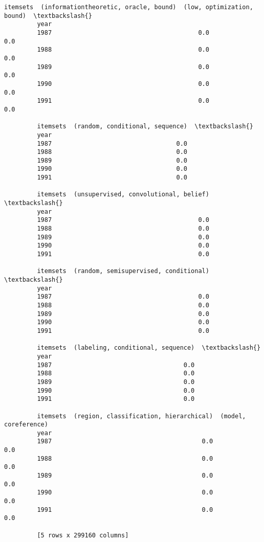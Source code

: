 \documentclass[11pt]{article}
\begin{document}
\begin{Verbatim}[commandchars=\\\{\}]
         itemsets  (informationtheoretic, oracle, bound)  (low, optimization, bound)  \textbackslash{}
         year                                                                          
         1987                                        0.0                         0.0   
         1988                                        0.0                         0.0   
         1989                                        0.0                         0.0   
         1990                                        0.0                         0.0   
         1991                                        0.0                         0.0   
         
         itemsets  (random, conditional, sequence)  \textbackslash{}
         year                                        
         1987                                  0.0   
         1988                                  0.0   
         1989                                  0.0   
         1990                                  0.0   
         1991                                  0.0   
         
         itemsets  (unsupervised, convolutional, belief)  \textbackslash{}
         year                                              
         1987                                        0.0   
         1988                                        0.0   
         1989                                        0.0   
         1990                                        0.0   
         1991                                        0.0   
         
         itemsets  (random, semisupervised, conditional)  \textbackslash{}
         year                                              
         1987                                        0.0   
         1988                                        0.0   
         1989                                        0.0   
         1990                                        0.0   
         1991                                        0.0   
         
         itemsets  (labeling, conditional, sequence)  \textbackslash{}
         year                                          
         1987                                    0.0   
         1988                                    0.0   
         1989                                    0.0   
         1990                                    0.0   
         1991                                    0.0   
         
         itemsets  (region, classification, hierarchical)  (model, coreference)  
         year                                                                    
         1987                                         0.0                   0.0  
         1988                                         0.0                   0.0  
         1989                                         0.0                   0.0  
         1990                                         0.0                   0.0  
         1991                                         0.0                   0.0  
         
         [5 rows x 299160 columns]
\end{Verbatim}
            
\end{document}
